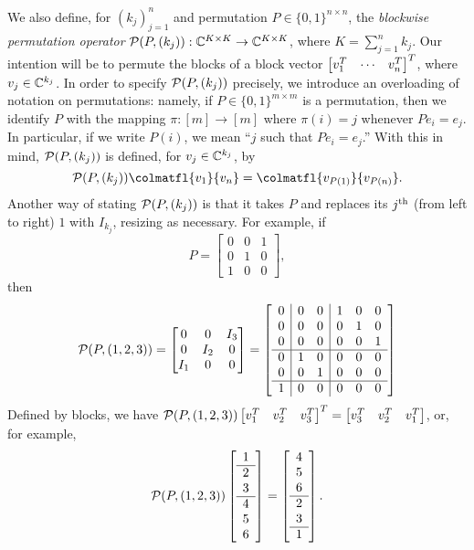 We also define, for $(k_j)_{j = 1}^n$ and permutation $P \in \{0, 1\}^{n \times n}$, the \emph{blockwise permutation operator} $\mathcal{P}(P, (k_j)) : \mathbb{C}^{K \times K} \to \mathbb{C}^{K \times K}$, where $K = \sum_{j = 1}^n k_j$.  Our intention will be to permute the blocks of a block vector $\begin{bmatrix} v^T_{1} & \cdots & v^T_{n} \end{bmatrix}^T$, where $v_j \in \mathbb{C}^{k_j}$.  In order to specify $\mathcal{P}(P, (k_j))$ precisely, we introduce an overloading of notation on permutations: namely, if $P \in \{0, 1\}^{m \times m}$ is a permutation, then we identify $P$ with the mapping $\pi : [m] \to [m]$ where $\pi(i) = j$ whenever $P e_i = e_j$.  In particular, if we write $P(i)$, we mean ``$j$ such that $P e_i = e_j$.''  With this in mind, $\mathcal{P}(P, (k_j))$ is defined, for $v_j \in \mathbb{C}^{k_j}$, by \begin{equation} \Pc(P, (k_j)) \colmatfl{v_1}{v_n} = \colmatfl{v_{P(1)}}{v_{P(n)}}. \label{eq:block_perm} \end{equation}  Another way of stating $\mathcal{P}(P, (k_j))$ is that it takes $P$ and replaces its $j^{\text{th}}$ (from left to right) $1$ with $I_{k_j}$, resizing as necessary.  For example, if \[P = \begin{bmatrix} 0 & 0 & 1 \\ 0 & 1 & 0 \\ 1 & 0 & 0 \end{bmatrix},\] then
\[
  \mathcal{P}(P, (1, 2, 3)) = \begin{bmatrix} 0 & 0 & I_3 \\ 0 & I_2 & 0 \\ I_1 & 0 & 0 \end{bmatrix} = \left[\begin{array}{c|cc|ccc}
    0 & 0 & 0 & 1 & 0 & 0 \\
    0 & 0 & 0 & 0 & 1 & 0 \\
    0 & 0 & 0 & 0 & 0 & 1 \\ \hline
    0 & 1 & 0 & 0 & 0 & 0 \\
    0 & 0 & 1 & 0 & 0 & 0 \\ \hline
    1 & 0 & 0 & 0 & 0 & 0 \\
  \end{array}\right]
\]
Defined by blocks, we have $\mathcal{P}(P, (1, 2, 3)) \begin{bmatrix} v_1^T & v_2^T & v_3^T \end{bmatrix}^T = \begin{bmatrix} v_3^T & v_2^T & v_1^T \end{bmatrix}$, or, for example, \[\mathcal{P}(P, (1, 2, 3)) \left[\begin{array}{c} 1 \\ \hline 2 \\ 3 \\ \hline 4 \\ 5 \\ 6 \end{array}\right] = \left[\begin{array}{c} 4 \\ 5 \\ 6 \\ \hline 2 \\ 3 \\ \hline 1 \end{array}\right].\]
